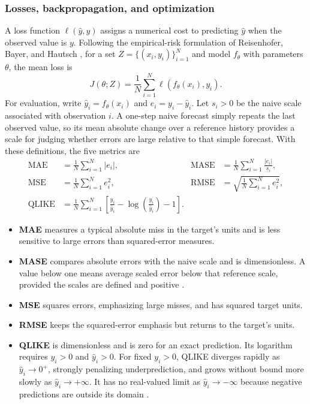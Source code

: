 \documentclass[12pt,a4paper]{article}
\numberwithin{equation}{section}
\numberwithin{table}{section}
\numberwithin{figure}{section}
\begin{document}
\subsubsection{Losses, backpropagation, and optimization}
A loss function $\ell(\widehat y,y)$ assigns a numerical cost to predicting $\widehat y$ when the observed value is $y$. Following the empirical-risk formulation of Reisenhofer, Bayer, and Hautsch \cite{reisenhofer2022}, for a set $Z=\{(x_i,y_i)\}_{i=1}^{N}$ and model $f_{\theta}$ with parameters $\theta$, the mean loss is
\begin{equation}\label{eq:empirical-loss}
J(\theta;Z)=\frac{1}{N}\sum_{i=1}^{N}\ell\!\left(f_{\theta}(x_i),y_i\right).
\end{equation}
For evaluation, write $\widehat y_i=f_{\theta}(x_i)$ and $e_i=y_i-\widehat y_i$. Let $s_i>0$ be the naive scale associated with observation $i$. A one-step naive forecast simply repeats the last observed value, so its mean absolute change over a reference history provides a scale for judging whether errors are large relative to that simple forecast. With these definitions, the five metrics are
\begin{equation}\label{eq:forecast-metrics}
\begin{aligned}
\mathrm{MAE}&=\frac1N\sum_{i=1}^{N}|e_i|, &
\mathrm{MASE}&=\frac1N\sum_{i=1}^{N}\frac{|e_i|}{s_i},\\
\mathrm{MSE}&=\frac1N\sum_{i=1}^{N}e_i^2, &
\mathrm{RMSE}&=\sqrt{\frac1N\sum_{i=1}^{N}e_i^2},\\
\mathrm{QLIKE}&=\frac1N\sum_{i=1}^{N}
\left[\frac{y_i}{\widehat y_i}-\log\!\left(\frac{y_i}{\widehat y_i}\right)-1\right].
\end{aligned}
\end{equation}

\begin{itemize}
\item \textbf{MAE} measures a typical absolute miss in the target's units and is less sensitive to large errors than squared-error measures.
\item \textbf{MASE} compares absolute errors with the naive scale and is dimensionless. A value below one means average scaled error below that reference scale, provided the scales are defined and positive \cite{hyndman2006}.
\item \textbf{MSE} squares errors, emphasizing large misses, and has squared target units.
\item \textbf{RMSE} keeps the squared-error emphasis but returns to the target's units.
\item \textbf{QLIKE} is dimensionless and is zero for an exact prediction. Its logarithm requires $y_i>0$ and $\widehat y_i>0$. For fixed $y_i>0$, QLIKE diverges rapidly as $\widehat y_i\to0^+$, strongly penalizing underprediction, and grows without bound more slowly as $\widehat y_i\to+\infty$. It has no real-valued limit as $\widehat y_i\to-\infty$ because negative predictions are outside its domain \cite{patton2011}.
\end{itemize}
\end{document}

